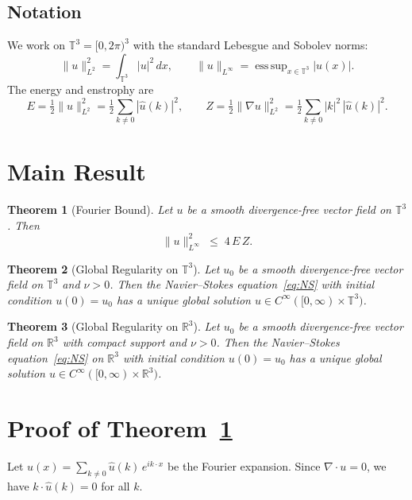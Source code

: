 \documentclass[11pt]{article}
\newtheorem{theorem}{Theorem}
\theoremstyle{definition}
\theoremstyle{remark}
\DeclareMathOperator{\esssup}{ess\,sup}
\begin{document}
\subsection{Notation}

We work on $\mathbb{T}^3 = [0,2\pi)^3$ with the standard
Lebesgue and Sobolev norms:
\[
  \|u\|_{L^2}^2 = \int_{\mathbb{T}^3} |u|^2\,dx,
  \qquad
  \|u\|_{L^\infty} = \esssup_{x \in \mathbb{T}^3} |u(x)|.
\]
The energy and enstrophy are
\[
  E = \tfrac{1}{2}\|u\|_{L^2}^2 = \tfrac{1}{2}\sum_{k \neq 0} |\hat{u}(k)|^2,
  \qquad
  Z = \tfrac{1}{2}\|\nabla u\|_{L^2}^2 = \tfrac{1}{2}\sum_{k \neq 0} |k|^2\,|\hat{u}(k)|^2.
\]

\section{Main Result}

\begin{theorem}[Fourier Bound]\label{thm:fourier}
Let $u$ be a smooth divergence-free vector field on
$\mathbb{T}^3$. Then
\begin{equation}\label{eq:bound}
  \|u\|_{L^\infty}^2 \;\le\; 4\,E\,Z.
\end{equation}
\end{theorem}

\begin{theorem}[Global Regularity on $\mathbb{T}^3$]\label{thm:main}
Let $u_0$ be a smooth divergence-free vector field on
$\mathbb{T}^3$ and $\nu > 0$. Then the Navier--Stokes
equation~\eqref{eq:NS} with initial condition $u(0) = u_0$
has a unique global solution $u \in C^\infty([0,\infty) \times
\mathbb{T}^3)$.
\end{theorem}

\begin{theorem}[Global Regularity on $\mathbb{R}^3$]\label{thm:r3}
Let $u_0$ be a smooth divergence-free vector field on
$\mathbb{R}^3$ with compact support and $\nu > 0$.
Then the Navier--Stokes equation~\eqref{eq:NS} on $\mathbb{R}^3$
with initial condition $u(0) = u_0$ has a unique global solution
$u \in C^\infty([0,\infty) \times \mathbb{R}^3)$.
\end{theorem}

\section{Proof of Theorem~\ref{thm:fourier}}

Let $u(x) = \sum_{k \neq 0} \hat{u}(k)\,e^{ik \cdot x}$ be the
Fourier expansion. Since $\nabla \cdot u = 0$, we have
$k \cdot \hat{u}(k) = 0$ for all $k$.
\end{document}
